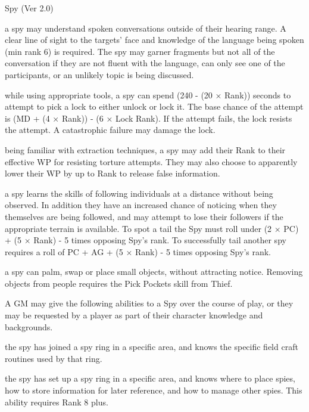 \begin{Chapter}{Spy (Ver 2.0)}
\begin{Description}
\item[Lip Reading] a spy may understand spoken conversations outside
  of their hearing range.  A clear line of sight to the targets’ face
  and knowledge of the language being spoken (min rank 6) is required.
  The spy may garner fragments but not all of the conversation if they
  are not fluent with the language, can only see one of the
  participants, or an unlikely topic is being discussed.

\item[Pick Locks] while using appropriate tools, a spy can spend (240
  - (20 × Rank)) seconds to attempt to pick a lock to either unlock or
  lock it. The base chance of the attempt is (MD + (4 × Rank)) - (6 ×
  Lock Rank). If the attempt fails, the lock resists the attempt.  A
  catastrophic failure may damage the lock.

\item[Resist Torture] being familiar with extraction techniques, a spy
  may add their Rank to their effective WP for resisting torture
  attempts.  They may also choose to apparently lower their WP by up
  to Rank to release false information.

\item[Shadowing] a spy learns the skills of following individuals at a
  distance without being observed. In addition they have an increased
  chance of noticing when they themselves are being followed, and may
  attempt to lose their followers if the appropriate terrain is
  available. To spot a tail the Spy must roll under (2 × PC) + (5 ×
  Rank) - 5 times opposing Spy’s rank.  To successfully tail another
  spy requires a roll of PC + AG + (5 × Rank) - 5 times opposing Spy’s
  rank.

\item[Sleight of Hand] a spy can palm, swap or place small objects,
  without attracting notice.  Removing objects from people requires
  the Pick Pockets skill from Thief.
\end{Description}

A GM may give the following abilities to a Spy over the course of
play, or they may be requested by a player as part of their character
knowledge and backgrounds.

\begin{Description}

\item[Network (area)] the spy has joined a spy ring in a specific
  area, and knows the specific field craft routines used by that ring.

\item[Spy Master (area)] the spy has set up a spy ring in a specific
  area, and knows where to place spies, how to store information for
  later reference, and how to manage other spies.  This ability
  requires Rank 8 plus.

\end{Description}

\end{Chapter}

